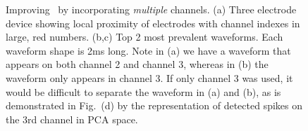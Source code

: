 \begin{center}
\begin{figure}[h!]
\begin{subfigure}[b]{.28\textwidth}
\caption{}
\label{3chpca}
\end{subfigure}
\caption{
Improving \smug\ by incorporating \emph{multiple} channels.
(a) Three electrode device showing local proximity of electrodes with channel indexes in large, red numbers. (b,c) Top 2 most prevalent waveforms.  Each waveform shape is 2ms long.   Note in (a) we have a waveform that appears on both channel 2 and channel 3, whereas in (b) the waveform only appears in channel 3.  If only channel 3 was used, it would be difficult to separate the waveform in (a) and (b), as is demonstrated in Fig.\ (d) by the representation of detected spikes on the 3rd channel in PCA space.
}
\end{figure}
\end{center}














